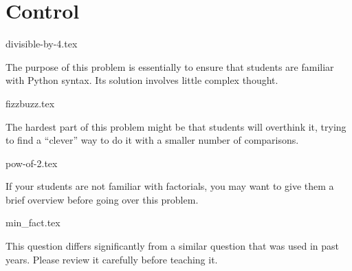\documentclass{exam}
\begin{document}
\section{Control}
\begin{questions}
{divisible-by-4.tex}
\begin{questionmeta}
  The purpose of this problem is essentially to ensure that students are familiar with Python syntax. Its solution involves little complex thought. 
\end{questionmeta}
{fizzbuzz.tex} 
\begin{questionmeta}
  The hardest part of this problem might be that students will overthink it, trying to find a ``clever'' way to do it with a smaller number of comparisons.
\end{questionmeta}
{pow-of-2.tex}
\begin{questionmeta}
  If your students are not familiar with factorials, you may want to give them a brief overview before going over this problem. 
\end{questionmeta}
{min_fact.tex}
\begin{questionmeta}
  This question differs significantly from a similar question that was used in past years. Please review it carefully before teaching it. 
\end{questionmeta}
\end{questions}
\end{document}

